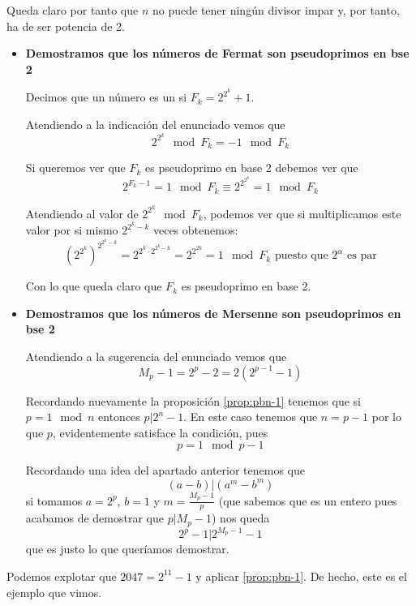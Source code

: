 \begin{problem}[10]
\begin{itemize}
Queda claro por tanto que $n$ no puede tener ningún divisor impar y, por tanto, ha de ser potencia de 2.
\end{itemize}
\spart

\begin{itemize}
\item \textbf{Demostramos que los números de Fermat son pseudoprimos en bse 2}

Decimos que un número es un  si $F_k=2^{2^k}+1$.

Atendiendo a la indicación del enunciado vemos que
\[2^{2^k} \mod F_k = -1 \mod F_k\]

Si queremos ver que $F_k$ es pseudoprimo en base 2 debemos ver que
\[2^{F_k-1} = 1 \mod F_k \equiv 2^{2^{2^k}} = 1 \mod F_k\]

Atendiendo al valor de $2^{2^k} \mod F_k$, podemos ver que si multiplicamos este valor por si mismo $2^{2^k-k}$ veces obtenemos:
\[\left(2^{2^k}\right)^{2^{2^k-k}} = 2^{2^k\cdot 2^{2^k-k}} = 2^{2^{2k}} = 1 \mod F_k \text{ puesto que } 2^α \text{ es par}\]

Con lo que queda claro que $F_k$ es pseudoprimo en base 2.

\item \textbf{Demostramos que los números de Mersenne son pseudoprimos en bse 2}

Atendiendo a la sugerencia del enunciado vemos que
\[M_p-1=2^{p}-2=2(2^{p-1}-1)\]

Recordando nuevamente la proposición \ref{prop:pbn-1} tenemos que si $p=1 \mod n$ entonces $p|2^n-1$. En este caso tenemos que $n=p-1$ por lo que $p$, evidentemente satisface la condición, pues
\[p = 1 \mod p-1\]

Recordando una idea del apartado anterior tenemos que
\[(a-b)|(a^m-b^m)\]
si tomamos $a=2^p$, $b=1$ y $m=\frac{M_p-1}{p}$ (que sabemos que es un entero pues acabamos de demostrar que $p|M_p-1$) nos queda
\[2^p-1 | 2^{M_p-1}-1\]
que es justo lo que queríamos demostrar.

\end{itemize}


\spart

Podemos explotar que $2047 = 2^{11} - 1$ y aplicar \ref{prop:pbn-1}. De hecho, este es el ejemplo que vimos.
\end{problem}



